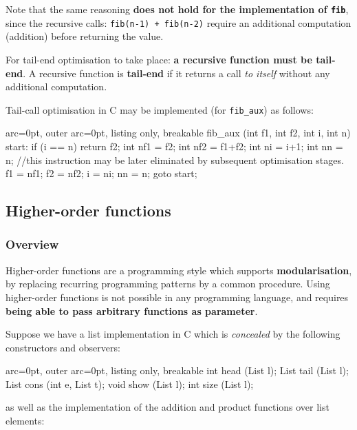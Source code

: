 Note that the same reasoning \textbf{does not hold for the implementation of \texttt{fib}}, since the recursive calls: \texttt{fib(n-1) + fib(n-2)} require an additional computation (addition) before returning the value. 

For tail-end optimisation to take place: \textbf{a recursive function must be tail-end}. A recursive function is \textbf{tail-end} if it returns a call \textit{to itself} without any additional computation.

Tail-call optimisation in C may be implemented (for \texttt{fib\_aux}) as follows:

\begin{tcblisting}{ arc=0pt, outer arc=0pt, listing only, breakable}
fib_aux (int f1, int f2, int i, int n){
start:
        if (i == n)
                return f2;
        int nf1 = f2;
        int nf2 = f1+f2;
        int ni = i+1;
        int nn = n;       //this instruction may be later eliminated by subsequent optimisation stages.
        f1 = nf1;
        f2 = nf2;
        i = ni;
        nn = n;
        goto start;
}

\end{tcblisting}



\subsection*{ Higher-order functions }

\subsubsection*{ Overview }
Higher-order functions are a programming style which supports \textbf{modularisation}, by replacing recurring programming patterns by a common procedure. Using higher-order functions is not possible in any programming language, and requires \textbf{being able to pass arbitrary functions as parameter}.

Suppose we have a list implementation in C which is \textit{concealed} by the following constructors and observers:


\begin{tcblisting}{ arc=0pt, outer arc=0pt, listing only, breakable}
int head (List l);
List tail (List l);
List cons (int e, List t);
void show (List l);
int size (List l);

\end{tcblisting}


as well as the implementation of the addition and product functions over list elements:

